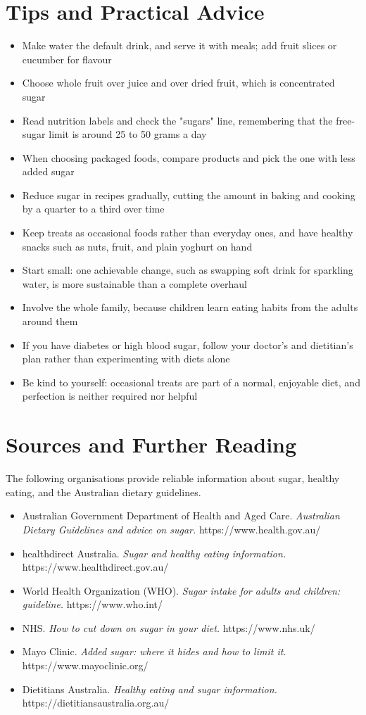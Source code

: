 \section*{Tips and Practical Advice}
\begin{itemize}
    \item Make water the default drink, and serve it with meals; add fruit slices or cucumber for flavour
    \item Choose whole fruit over juice and over dried fruit, which is concentrated sugar
    \item Read nutrition labels and check the "sugars" line, remembering that the free-sugar limit is around 25 to 50 grams a day
    \item When choosing packaged foods, compare products and pick the one with less added sugar
    \item Reduce sugar in recipes gradually, cutting the amount in baking and cooking by a quarter to a third over time
    \item Keep treats as occasional foods rather than everyday ones, and have healthy snacks such as nuts, fruit, and plain yoghurt on hand
    \item Start small: one achievable change, such as swapping soft drink for sparkling water, is more sustainable than a complete overhaul
    \item Involve the whole family, because children learn eating habits from the adults around them
    \item If you have diabetes or high blood sugar, follow your doctor's and dietitian's plan rather than experimenting with diets alone
    \item Be kind to yourself: occasional treats are part of a normal, enjoyable diet, and perfection is neither required nor helpful
\end{itemize}

\section*{Sources and Further Reading}
The following organisations provide reliable information about sugar, healthy eating, and the Australian dietary guidelines.

\begin{itemize}
    \item Australian Government Department of Health and Aged Care. \textit{Australian Dietary Guidelines and advice on sugar.} https://www.health.gov.au/
    \item healthdirect Australia. \textit{Sugar and healthy eating information.} https://www.healthdirect.gov.au/
    \item World Health Organization (WHO). \textit{Sugar intake for adults and children: guideline.} https://www.who.int/
    \item NHS. \textit{How to cut down on sugar in your diet.} https://www.nhs.uk/
    \item Mayo Clinic. \textit{Added sugar: where it hides and how to limit it.} https://www.mayoclinic.org/
    \item Dietitians Australia. \textit{Healthy eating and sugar information.} https://dietitiansaustralia.org.au/
\end{itemize}

\clearpage
